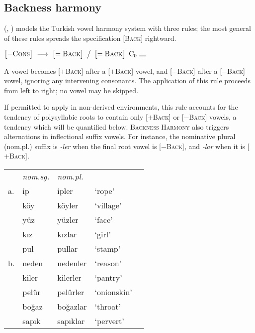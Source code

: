 \subsection{Backness harmony}
\label{ss:bh}

\citeauthor{Lees1966b} (\citeyear[35]{Lees1966b}, \citeyear[284]{Lees1966a}) models the Turkish vowel harmony system with three rules; the most general of these rules spreads the specification [\textsc{Back}] rightward.

\begin{example}
$\begin{bmatrix} -\textsc{Cons} \end{bmatrix}~\goesto~\begin{bmatrix} =\textsc{Back} \end{bmatrix}~\big /~\begin{bmatrix} =\textsc{Back} \end{bmatrix}~\textrm{C}_0~\gap$
\end{example}

\noindent
A vowel becomes [$+$\textsc{Back}] after a [$+$\textsc{Back}] vowel, and [$-$\textsc{Back}] after a [$-$\textsc{Back}] vowel, ignoring any intervening consonants. The application of this rule proceeds from left to right; no vowel may be skipped.

If permitted to apply in non-derived environments, this rule accounts for the tendency of polysyllabic roots to contain only [$+$\textsc{Back}] or [$-$\textsc{Back}] vowels, a tendency which will be quantified below. \textsc{Backness Harmony} also triggers alternations in inflectional suffix vowels. For instance, the nominative plural (nom.pl.) suffix is \emph{-ler} when the final root vowel is [$-$\textsc{Back}], and \emph{-lar} when it is [$+$\textsc{Back}].

\begin{example}
\label{turknom}
\begin{tabular}{lllll}
   & \emph{nom.sg.} & \emph{nom.pl.} \\
a. & {ip}           & {ipler}    & `rope'         & \citep[][216]{Clements1982} \\
   & {köy}          & {köyler}   & `village'      \\
   & {yüz}          & {yüzler}   & `face'         \\
   & {kız}          & {kızlar}   & `girl'         \\
   & {pul}          & {pullar}   & `stamp'        \\
b. & {neden}        & {nedenler} & `reason'       & \citep{TELL} \\
   & {kiler}        & {kilerler} & `pantry'       \\
   & {pelür}        & {pelürler} & `onionskin'    \\
   & {boğaz}        & {boğazlar} & `throat'       \\
   & {sapık}        & {sapıklar} & `pervert'      \\
\end{tabular}
\end{example}

